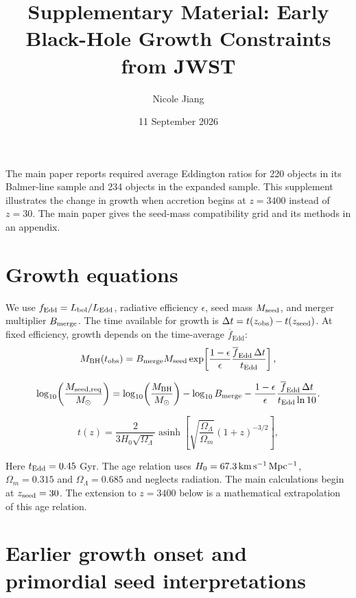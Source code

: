 \documentclass[11pt]{article}
\title{Supplementary Material: Early Black-Hole Growth Constraints from JWST}
\author{Nicole Jiang}
\date{11 September 2026}
\newcommand{\fedd}{f_{\mathrm{Edd}}}
\newcommand{\mbh}{M_{\mathrm{BH}}}
\newcommand{\mseed}{M_{\mathrm{seed}}}
\begin{document}
\maketitle

The main paper reports required average Eddington ratios for 220 objects in
its Balmer-line sample and 234 objects in the expanded sample. This supplement
illustrates the change in growth when accretion begins at $z=3400$ instead
of $z=30$. The main paper gives the seed-mass compatibility grid and its methods
in an appendix.

\section{Growth equations}

We use $\fedd=L_{\rm bol}/L_{\rm Edd}$, radiative efficiency $\epsilon$,
seed mass $M_{\rm seed}$, and merger multiplier $B_{\rm merge}$.
The time available for growth is $\Delta t=t(z_{\rm obs})-t(z_{\rm seed})$.
At fixed efficiency, growth depends on the time-average $\overline{f}_{\mathrm{Edd}}$:
\begin{equation}
\mbh(t_{\rm obs})=B_{\rm merge}\mseed
\exp\!\left[\frac{1-\epsilon}{\epsilon}
\frac{\overline{f}_{\mathrm{Edd}}\,\Delta t}{t_{\rm Edd}}\right],
\label{eq:growth}
\end{equation}

\begin{equation}
\log_{10}\!\left(\frac{M_{\rm seed,req}}{M_\odot}\right)
=\log_{10}\!\left(\frac{\mbh}{M_\odot}\right)-\log_{10}B_{\rm merge}
-\frac{1-\epsilon}{\epsilon}
\frac{\overline{f}_{\mathrm{Edd}}\,\Delta t}{t_{\rm Edd}\ln 10}.
\label{eq:required-seed}
\end{equation}

\begin{equation}
t(z)=\frac{2}{3H_0\sqrt{\Omega_\Lambda}}
\operatorname{asinh}\!\left[\sqrt{\frac{\Omega_\Lambda}{\Omega_m}}
(1+z)^{-3/2}\right],
\label{eq:cosmictime}
\end{equation}

Here $t_{\rm Edd}=0.45$ Gyr. The age relation uses
$H_0=67.3\,{\rm km\,s^{-1}\,Mpc^{-1}}$, $\Omega_m=0.315$ and
$\Omega_\Lambda=0.685$ and neglects radiation. The main calculations begin
at $z_{\rm seed}=30$. The extension to $z=3400$ below is a mathematical
extrapolation of this age relation.

\section{Earlier growth onset and primordial seed interpretations}
\label{app:primordial-timing}
\end{document}
